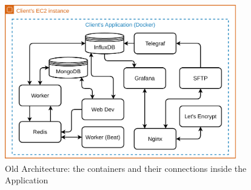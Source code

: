 \begin{figure}[!htbp]
    \centering
    \includegraphics[width=0.90\textwidth]{img/diagrams/pdf/old-arch-connections.drawio.pdf}
    \caption[Old Architecture's Containers]{Old Architecture: the containers and their connections inside the Application}
    \label{fig:old-arch-connections}
\end{figure}
